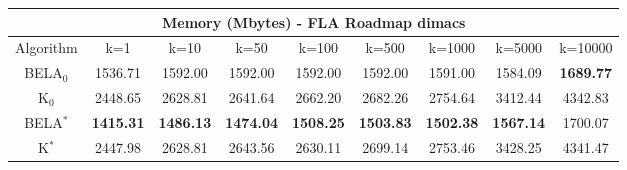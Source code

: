 \begin{tabular}{c|cccccccc}\toprule
\multicolumn{9}{c}{Memory (Mbytes) - FLA Roadmap dimacs}\\ \midrule
Algorithm & k=1 & k=10 & k=50 & k=100 & k=500 & k=1000 & k=5000 & k=10000 \\ \midrule
BELA$_0$ & 1536.71 & 1592.00 & 1592.00 & 1592.00 & 1592.00 & 1591.00 & 1584.09 & \textbf{1689.77} \\
K$_0$ & 2448.65 & 2628.81 & 2641.64 & 2662.20 & 2682.26 & 2754.64 & 3412.44 & 4342.83 \\
BELA$^*$ & \textbf{1415.31} & \textbf{1486.13} & \textbf{1474.04} & \textbf{1508.25} & \textbf{1503.83} & \textbf{1502.38} & \textbf{1567.14} & 1700.07 \\
K$^*$ & 2447.98 & 2628.81 & 2643.56 & 2630.11 & 2699.14 & 2753.46 & 3428.25 & 4341.47 \\ \bottomrule 
\end{tabular}
